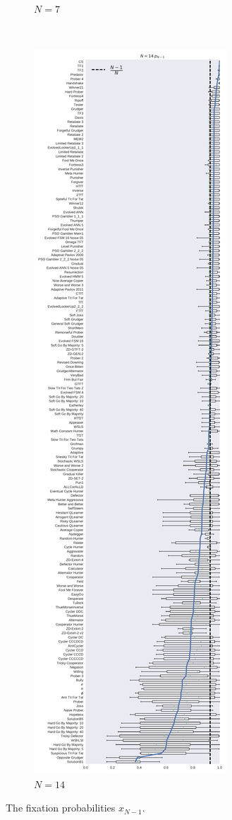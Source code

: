 \documentclass{article}
\begin{document}
\begin{figure}[!hbtp]
\begin{subfigure}{.3\textwidth}
        \caption{\(N=7\)}
        \label{fig:boxplot_7_resist}
    \end{subfigure}%
    ~
    \begin{subfigure}{.3\textwidth}
        \centering
        \includegraphics[height=.9\textheight]{./img/boxplot_14_resist.pdf}
        \caption{\(N=14\)}
        \label{fig:boxplot_14_resist}
    \end{subfigure}
    \caption{The fixation probabilities \(x_{N-1}\).}
\end{figure}
\end{document}
